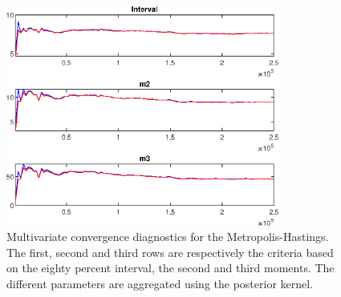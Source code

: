  
\begin{figure}[H]
\centering 
\includegraphics[width=0.8\textwidth]{directed_search_est_alt_obs/Output/directed_search_est_alt_obs_mdiag}
\caption{Multivariate convergence diagnostics for the Metropolis-Hastings.
The first, second and third rows are respectively the criteria based on
the eighty percent interval, the second and third moments. The different 
parameters are aggregated using the posterior kernel.}\label{Fig:MultivariateDiagnostics}
\end{figure}


